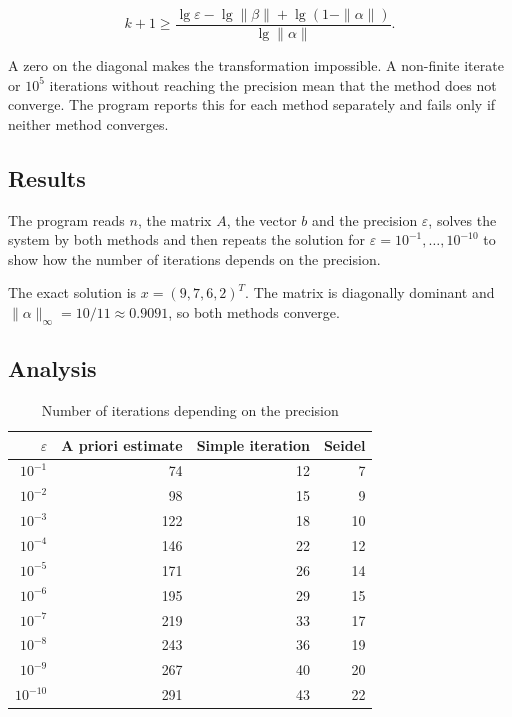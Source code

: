 \[
k + 1 \ge \frac{\lg \varepsilon - \lg \|\beta\| + \lg (1 - \|\alpha\|)}{\lg \|\alpha\|}.
\]

A zero on the diagonal makes the transformation impossible. A non-finite iterate or $10^5$
iterations without reaching the precision mean that the method does not converge. The program
reports this for each method separately and fails only if neither method converges.

\subsection{Results}

The program reads $n$, the matrix $A$, the vector $b$ and the precision $\varepsilon$, solves the
system by both methods and then repeats the solution for $\varepsilon = 10^{-1}, \ldots, 10^{-10}$
to show how the number of iterations depends on the precision.




The exact solution is $x = (9, 7, 6, 2)^T$. The matrix is diagonally dominant and
$\|\alpha\|_\infty = 10/11 \approx 0.9091$, so both methods converge.

\subsection{Analysis}

\begin{table}[!ht]
\centering
\begin{tabular}{|r|r|r|r|}
\hline
\rowcolor{lightgray}
$\varepsilon$ & A priori estimate & Simple iteration & Seidel \\
\hline
$10^{-1}$ & 74 & 12 & 7 \\
\hline
$10^{-2}$ & 98 & 15 & 9 \\
\hline
$10^{-3}$ & 122 & 18 & 10 \\
\hline
$10^{-4}$ & 146 & 22 & 12 \\
\hline
$10^{-5}$ & 171 & 26 & 14 \\
\hline
$10^{-6}$ & 195 & 29 & 15 \\
\hline
$10^{-7}$ & 219 & 33 & 17 \\
\hline
$10^{-8}$ & 243 & 36 & 19 \\
\hline
$10^{-9}$ & 267 & 40 & 20 \\
\hline
$10^{-10}$ & 291 & 43 & 22 \\
\hline
\end{tabular}
\caption{Number of iterations depending on the precision}
\end{table}

